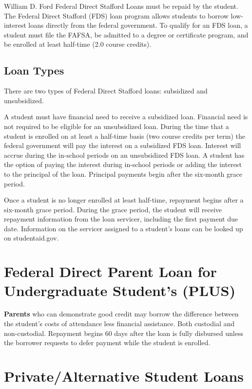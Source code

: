 \documentclass[
  letterpaper,
]{scrbook}
\begin{document}
William D. Ford Federal Direct Stafford Loans must be repaid by the
student. The Federal Direct Stafford (FDS) loan program allows students
to borrow low-interest loans directly from the federal government. To
qualify for an FDS loan, a student must file the FAFSA, be admitted to a
degree or certificate program, and be enrolled at least half-time (2.0
course credits).

\subsection{\texorpdfstring{\textbf{Loan
Types}}{Loan Types}}\label{loan-types}

There are two types of Federal Direct Stafford loans: subsidized and
unsubsidized.

A student must have financial need to receive a subsidized loan.
Financial need is not required to be eligible for an unsubsidized loan.
During the time that a student is enrolled on at least a half-time basis
(two course credits per term) the federal government will pay the
interest on a subsidized FDS loan. Interest will accrue during the
in-school periods on an unsubsidized FDS loan. A student has the option
of paying the interest during in-school periods or adding the interest
to the principal of the loan. Principal payments begin after the
six-month grace period.

Once a student is no longer enrolled at least half-time, repayment
begins after a six-month grace period. During the grace period, the
student will receive repayment information from the loan servicer,
including the first payment due date. Information on the servicer
assigned to a student's loans can be looked up on studentaid.gov.

\section{\texorpdfstring{\textbf{Federal Direct Parent Loan for
Undergraduate Student's
(PLUS)}}{Federal Direct Parent Loan for Undergraduate Student's (PLUS)}}\label{federal-direct-parent-loan-for-undergraduate-students-plus}

\textbf{Parents} who can demonstrate good credit may borrow the
difference between the student's costs of attendance less financial
assistance. Both custodial and non-custodial. Repayment begins 60 days
after the loan is fully disbursed unless the borrower requests to defer
payment while the student is enrolled.

\section{Private/Alternative Student
Loans}\label{privatealternative-student-loans}
\end{document}
